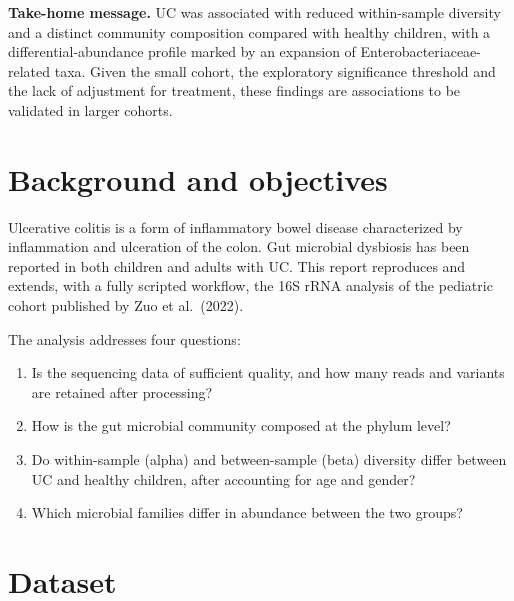 \documentclass[
  letterpaper,
  DIV=11,
  numbers=noendperiod]{scrartcl}
\providecommand{\tightlist}{%
  \setlength{\itemsep}{0pt}\setlength{\parskip}{0pt}}
\begin{document}
\textbf{Take-home message.} UC was associated with reduced within-sample
diversity and a distinct community composition compared with healthy
children, with a differential-abundance profile marked by an expansion
of Enterobacteriaceae-related taxa. Given the small cohort, the
exploratory significance threshold and the lack of adjustment for
treatment, these findings are associations to be validated in larger
cohorts.

\section{Background and objectives}\label{background-and-objectives}

Ulcerative colitis is a form of inflammatory bowel disease characterized
by inflammation and ulceration of the colon. Gut microbial dysbiosis has
been reported in both children and adults with UC. This report
reproduces and extends, with a fully scripted workflow, the 16S rRNA
analysis of the pediatric cohort published by Zuo et al.~(2022).

The analysis addresses four questions:

\begin{enumerate}
\def\labelenumi{\arabic{enumi}.}
\tightlist
\item
  Is the sequencing data of sufficient quality, and how many reads and
  variants are retained after processing?
\item
  How is the gut microbial community composed at the phylum level?
\item
  Do within-sample (alpha) and between-sample (beta) diversity differ
  between UC and healthy children, after accounting for age and gender?
\item
  Which microbial families differ in abundance between the two groups?
\end{enumerate}

\section{Dataset}\label{dataset}
\end{document}
